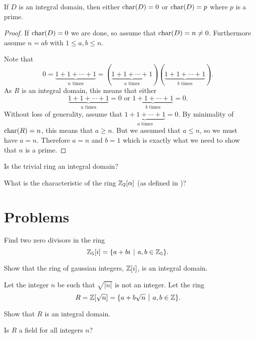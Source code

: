 \begin{proposition}\label{prop-zero-of-prime-characteristic-if-integral-domain}
    If $D$ is an integral domain, then either $\mathrm{char}(D) = 0$ or $\mathrm{char}(D) = p$ where $p$ is a prime.
\end{proposition}
\begin{proof}
    If $\mathrm{char}(D) = 0$ we are done, so assume that $\mathrm{char}(D) = n \neq 0$. Furthermore assume $n = ab$ with $1 \leq a,b \leq n$.

    Note that
    \[
        0 = \underbrace{1 + 1 + \cdots + 1}_{n \text{ times}} = (\underbrace{1+1+\cdots+1}_{a \text{ times}})(\underbrace{1+1+\cdots+1}_{b \text{ times}}).
    \]
    As $R$ is an integral domain, this means that either
    \[
        \underbrace{1+1+\cdots+1}_{a \text{ times}} = 0 \text{ or } \underbrace{1+1+\cdots+1}_{b \text{ times}} = 0.
    \]
    Without loss of generality, assume that $\underbrace{1+1+\cdots+1}_{a \text{ times}} = 0$. By minimality of $\mathrm{char}(R) = n$, this means that $a \geq n$. But we assumed that $a \leq n$, so we must have $a = n$. Therefore $a = n$ and $b = 1$ which is exactly what we need to show that $n$ is a prime.
\end{proof}

\begin{exercise}\label{exercise-trivial-ring-is-not-an-integral-domain}
    Is the trivial ring an integral domain?
\end{exercise}
\begin{exercise}
    What is the characteristic of the ring $\mathbb{Z}_2[\alpha]$ (as defined in )?
\end{exercise} 

\newpage

\section{Problems}
\begin{problem}
    Find two zero divisors in the ring
    \[
        \Z_5[i] = \{a + bi \vert a,b\in\Z_5\}.
    \]
\end{problem}

\begin{problem}
    Show that the ring of gaussian integers, $\mathbb{Z}[i]$, is an integral domain.
\end{problem}

\begin{problem}
    Let the integer $n$ be such that $\sqrt{|n|}$ is not an integer. Let the ring
    \[
        R = \Z[\sqrt{n}] = \{a + b\sqrt{n} \vert a,b\in \Z\}.
    \]
    \begin{partquestions}{\alph*}
        \item Show that $R$ is an integral domain.
        \item Is $R$ a field for all integers $n$?
    \end{partquestions}
\end{problem}

